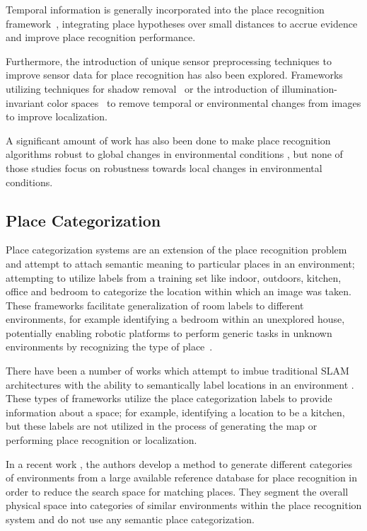 \documentclass[letterpaper, 10 pt, conference]{ieeeconf}  %
\begin{document}
Temporal information is generally incorporated into the place recognition framework~\cite{Milford2012}, integrating place hypotheses over small distances to accrue evidence and improve place recognition performance.

Furthermore, the introduction of unique sensor preprocessing techniques to improve sensor data for place recognition has also been explored. Frameworks utilizing techniques for shadow removal~\cite{corke2013dealing} or the introduction of illumination-invariant color spaces~\cite{mcmanus2014shady} to remove temporal or environmental changes from images to improve localization. 

A significant amount of work has also been done to make place recognition algorithms robust to global changes in environmental conditions \cite{Maddern,McManus2015}, but none of those studies focus on robustness towards local changes in environmental conditions.

\subsection{Place Categorization}

Place categorization systems are an extension of the place recognition problem and attempt to attach semantic meaning to particular places in an environment; attempting to utilize labels from a training set like indoor, outdoors, kitchen, office and bedroom to categorize the location within which an image was taken. These frameworks facilitate generalization of room labels to different environments, for example identifying a bedroom within an unexplored house, potentially enabling robotic platforms to perform generic tasks in unknown environments by recognizing the type of place~\cite{wu2009visual}. 

There have been a number of works which attempt to imbue traditional SLAM architectures with the ability to semantically label locations in an environment \cite{sunderhauf2016place}. These types of frameworks utilize the place categorization labels to provide information about a space; for example, identifying a location to be a kitchen, but these labels are not utilized in the process of generating the map or performing place recognition or localization. 

In a recent work \cite{mohan2015environment}, the authors develop a method to generate different categories of environments from a large available reference database for place recognition in order to reduce the search space for matching places. They segment the overall physical space into categories of similar environments within the place recognition system and do not use any semantic place categorization.
\end{document}
